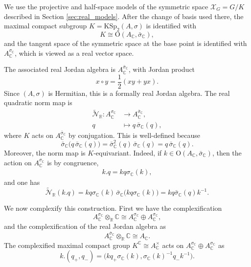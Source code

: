 \documentclass[oneside,11pt]{amsart}
\theoremstyle{definition}
\theoremstyle{remark}
\numberwithin{thm}{section}
\numberwithin{equation}{section}
\begin{document}
We use the projective and half-space models of the symmetric space $\mathcal{X}_G=G/K$ described in Section \ref{sec:real_models}. After the change of basis used there, the
maximal compact subgroup $K=\mathrm{KSp}_2(A,\sigma)$ is identified with
\[
K\cong \mathrm{O}(A_{\mathbb C},\bar\sigma_{\mathbb C}),
\]
and the tangent space of the symmetric space at the base point is identified with $A_{\mathbb C}^{\sigma_{\mathbb C}}$, which is viewed as a real vector space.

The associated real Jordan algebra is $A_{\mathbb C}^{\bar\sigma_{\mathbb C}}$, with Jordan product
\[
x\circ y=\frac{1}{2}(xy+yx).
\]
Since $(A,\sigma)$ is Hermitian, this is a formally real Jordan algebra. The real quadratic norm map is
\begin{align*}
    \tilde{\mathcal{N}}_{\mathbb R}:
A_{\mathbb C}^{\sigma_{\mathbb C}}&\longrightarrow A_{\mathbb C}^{\bar\sigma_{\mathbb C}},\\
q&\longmapsto q\,\bar\sigma_{\mathbb C}(q),
\end{align*}
where $K$ acts on $A_{\mathbb C}^{\bar\sigma_{\mathbb C}}$ by conjugation. This is well-defined because
\[
\bar\sigma_{\mathbb C}\bigl(q\,\bar\sigma_{\mathbb C}(q)\bigr)=\bar\sigma_{\mathbb C}^2(q)\,\bar\sigma_{\mathbb C}(q)=q\,\bar\sigma_{\mathbb C}(q).
\]
Moreover, the norm map is $K$-equivariant. Indeed, if
$k\in \mathrm{O}(A_{\mathbb C},\bar\sigma_{\mathbb C})$,
then the action on $A_{\mathbb C}^{\sigma_{\mathbb C}}$ is by congruence,
\begin{align}\label{eq:action_on_A_C^sigma}
    k.q=kq\sigma_{\mathbb C}(k),
\end{align}
and one has
\[
\tilde{\mathcal{N}}_{\mathbb R}(k.q)=kq\sigma_{\mathbb C}(k)\,\bar\sigma_{\mathbb C}\bigl(kq\sigma_{\mathbb C}(k)\bigr)=kq\bar\sigma_{\mathbb C}(q)k^{-1}.
\]


We now complexify this construction. First we have the complexification
\[
A_{\mathbb C}^{\sigma_{\mathbb C}}\otimes_{\mathbb R}\mathbb{C}\cong 
A_{\mathbb C}^{\sigma_{\mathbb C}}\oplus A_{\mathbb C}^{\sigma_{\mathbb C}}, 
\]
and the complexification of the real Jordan algebra as
\[
A_{\mathbb C}^{\bar\sigma_{\mathbb C}}\otimes_{\mathbb R}\mathbb C
\cong A_{\mathbb C}.
\]
The complexified maximal compact group $K^{\mathbb C}\cong A_{\mathbb C}^{\times}$ acts on $A_{\mathbb C}^{\sigma_{\mathbb C}}\oplus A_{\mathbb C}^{\sigma_{\mathbb C}}$ as 
\[
k.(q_+,q_-)=\bigl(kq_+\sigma_{\mathbb C}(k),
\sigma_{\mathbb C}(k)^{-1}q_-k^{-1}\bigr).
\]
\end{document}

